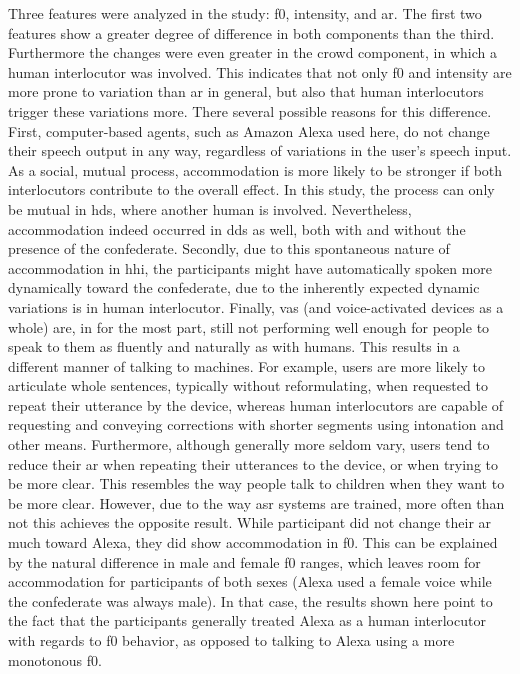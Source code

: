 Three features were analyzed in the study: \acf{f0}, intensity, and \acf{ar}.
The first two features show a greater degree of difference in both components than the third.
Furthermore the changes were even greater in the crowd component, in which a human interlocutor was involved.
This indicates that not only \ac{f0} and intensity are more prone to variation than \ac{ar} in general, but also that human interlocutors trigger these variations more.
There several possible reasons for this difference.
First, computer-based agents, such as Amazon Alexa used here, do not change their speech output in any way, regardless of variations in the user's speech input.
As a social, mutual process, accommodation is more likely to be stronger if both interlocutors contribute to the overall effect.
In this study, the process can only be mutual in \ac{hds}, where another human is involved.
Nevertheless, accommodation indeed occurred in \ac{dds} as well, both with and without the presence of the confederate.
Secondly, due to this spontaneous nature of accommodation in \ac{hhi}, the participants might have automatically spoken more dynamically toward the confederate, due to the inherently expected dynamic variations is in human interlocutor.
Finally, \acp{va} (and voice-activated devices as a whole) are, in for the most part, still not performing well enough for people to speak to them as fluently and naturally as with humans.
This results in a different manner of talking to machines.
For example, users are more likely to articulate whole sentences, typically without reformulating, when requested to repeat their utterance by the device, whereas human interlocutors are capable of requesting and conveying corrections with shorter segments using intonation and other means.
Furthermore, although generally more seldom vary, users tend to reduce their \ac{ar} when repeating their utterances to the device, or when trying to be more clear.
This resembles the way people talk to children when they want to be more clear.
However, due to the way \ac{asr} systems are trained, more often than not this achieves the opposite result.
While participant did not change their \ac{ar} much toward Alexa, they did show accommodation in \ac{f0}.
This can be explained by the natural difference in male and female \ac{f0} ranges, which leaves room for accommodation for participants of both sexes (Alexa used a female voice while the confederate was always male).
In that case, the results shown here point to the fact that the participants generally treated Alexa as a human interlocutor with regards to \ac{f0} behavior, as opposed to talking to Alexa using a more monotonous \ac{f0}.
